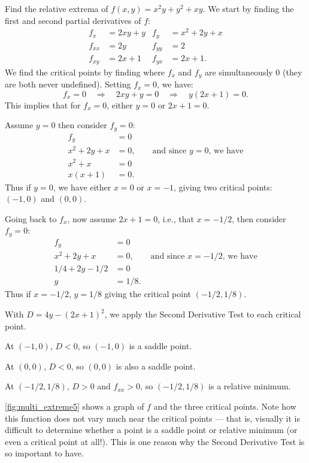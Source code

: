 \begin{example}\label{ex_multi_extreme5}
Find the relative extrema of $f(x,y) = x^2y+y^2+xy$.
\solution
We start by finding the first and second partial derivatives of $f$:
\begin{align*}
f_x &= 2xy+y & f_y &= x^2+2y+x \\
f_{xx} &= 2y & f_{yy} &= 2\\
f_{xy} &= 2x+1 & f_{yx} &= 2x+1.
\end{align*}
We find the critical points by finding where $f_x$ and $f_y$ are simultaneously 0 (they are both never undefined). Setting $f_x=0$, we have:
\[f_x=0 \quad \Rightarrow \quad 2xy+y=0\quad \Rightarrow \quad y(2x+1)=0.\]
This implies that for $f_x=0$, either $y=0$ or $2x+1=0$.

Assume $y=0$ then consider $f_y=0$:
\begin{align*}
f_y &= 0\\
x^2+2y+x &= 0,  \qquad \text{and since $y=0$, we have}\\
x^2+x &= 0\\
x(x+1) & = 0.
\end{align*}
Thus if $y=0$, we have either $x=0$ or $x=-1$, giving two critical points: $(-1,0)$ and $(0,0)$. 

Going back to $f_x$, now assume $2x+1=0$, i.e., that $x=-1/2$, then consider $f_y=0$:
\begin{align*}
f_y &= 0\\
x^2+2y+x &= 0,  \qquad \text{and since $x=-1/2$, we have}\\
1/4+2y-1/2 &= 0\\
y&= 1/8.
\end{align*}
Thus if $x=-1/2$, $y=1/8$ giving the critical point $(-1/2,1/8)$. 

With $D = 4y-(2x+1)^2$, we apply the Second Derivative Test to each critical point.

At $(-1,0)$, $D <0$, so $(-1,0)$ is a saddle point.

At $(0,0)$, $D<0$, so $(0,0)$ is also a saddle point.

At $(-1/2,1/8)$, $D>0$ and $f_{xx} > 0$, so $(-1/2,1/8)$ is a relative minimum.

\autoref{fig:multi_extreme5} shows a graph of $f$ and the three critical points. Note how this function does not vary much near the critical points --- that is, visually it is difficult to determine whether a point is a saddle point or relative minimum (or even a critical point at all!). This is one reason why the Second Derivative Test is so important to have.
\end{example}

